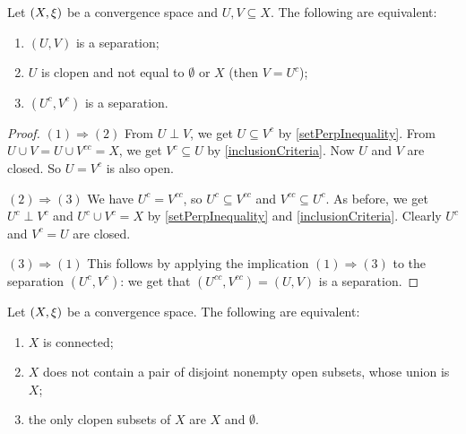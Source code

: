 \begin{lemma} \label{disconnectionLemma}
Let $\sSet{X, \xi}$ be a convergence space and $U,V\subseteq X$. The following are equivalent:
\begin{enumerate}
\item $(U, V)$ is a separation;
\item $U$ is clopen and not equal to $\emptyset$ or $X$ (then $V= U^c$);
\item $(U^c, V^c)$ is a separation.
\end{enumerate}
\end{lemma}
\begin{proof}
$(1) \Rightarrow (2)$ From $U\perp V$, we get $U\subseteq V^c$ by \ref{setPerpInequality}. From $U\cup V = U\cup V^{cc} = X$, we get $V^c \subseteq U$ by \ref{inclusionCriteria}. Now $U$ and $V$ are closed. So $U = V^c$ is also open.

$(2) \Rightarrow (3)$ We have $U^c = V^{cc}$, so $U^c \subseteq V^{cc}$ and $V^{cc}\subseteq U^c$. As before, we get $U^c\perp V^c$ and $U^c \cup V^c = X$ by \ref{setPerpInequality} and \ref{inclusionCriteria}. Clearly $U^c$ and $V^c = U$ are closed.

$(3) \Rightarrow (1)$ This follows by applying the implication $(1) \Rightarrow (3)$ to the separation $(U^c, V^c)$: we get that $(U^{cc}, V^{cc}) = (U,V)$ is a separation.
\end{proof}
\begin{corollary} \label{connectedCriteria}
Let $\sSet{X, \xi}$ be a convergence space. The following are equivalent:
\begin{enumerate}
\item $X$ is connected;
\item $X$ does not contain a pair of disjoint nonempty open subsets, whose union is $X$;
\item the only clopen subsets of $X$ are $X$ and $\emptyset$.
\end{enumerate}
\end{corollary}


